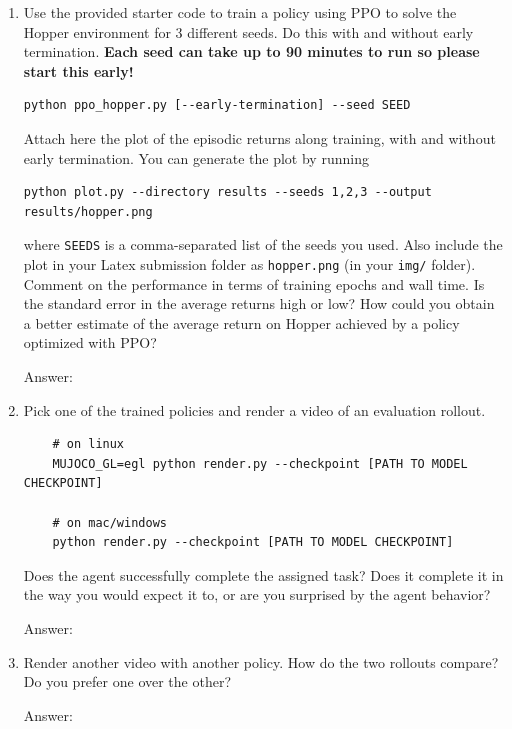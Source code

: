 \documentclass{article}
\newcommand{\answer}[1]{
    \begin{tcolorbox}[breakable]
    Answer: #1
    \end{tcolorbox}
    \clearpage
}
\begin{document}
\begin{enumerate}

    \item[(d)] Use the provided starter code to train a policy using PPO to solve the Hopper environment for 3 different seeds. Do this with and without early termination. \textbf{Each seed can take up to 90 minutes to run so please start this early!} 

{\small
\begin{tcolorbox}
\begin{verbatim}
python ppo_hopper.py [--early-termination] --seed SEED
\end{verbatim}
\end{tcolorbox}
}

    Attach here the plot of the episodic returns along training, with and without early termination. You can generate the plot by running
{\small
\begin{tcolorbox}
\begin{verbatim}
python plot.py --directory results --seeds 1,2,3 --output results/hopper.png
\end{verbatim}
\end{tcolorbox}
}
    
    where \texttt{SEEDS} is a comma-separated list of the seeds you used. Also include the plot in your Latex submission folder as \texttt{hopper.png} (in your \texttt{img/} folder). Comment on the performance in terms of training epochs and wall time. Is the standard error in the average returns high or low? How could you obtain a better estimate of the average return on Hopper achieved by a policy optimized with PPO?
    \answer{

    }

    \item[(e)] Pick one of the trained policies and render a video of an evaluation rollout.

    {\small
    \begin{tcolorbox}
    \begin{verbatim}
    # on linux
    MUJOCO_GL=egl python render.py --checkpoint [PATH TO MODEL CHECKPOINT]

    # on mac/windows
    python render.py --checkpoint [PATH TO MODEL CHECKPOINT]
    \end{verbatim}
    \end{tcolorbox}
    }

    Does the agent successfully complete the assigned task? Does it complete it in the way you would expect it to, or are you surprised by the agent behavior?
    \answer{

    }

    \item[(f)] Render another video with another policy. How do the two rollouts compare? Do you prefer one over the other?
    \answer{

    }

\end{enumerate}
\end{document}
